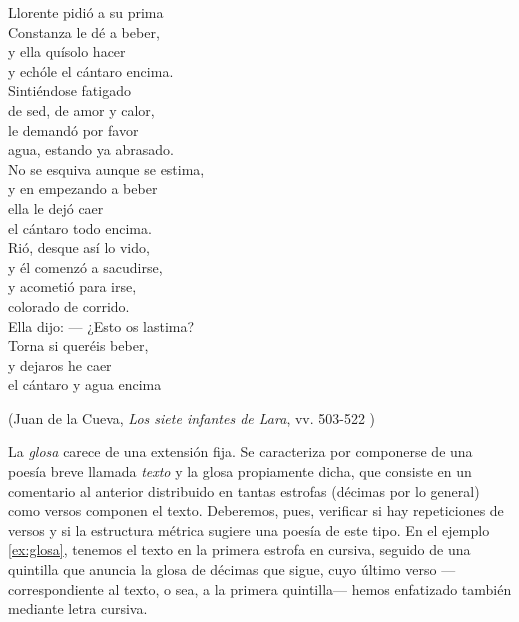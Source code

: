 \begin{exe}
	\ex\label{ex:cancion}\begin{multicols}{2}Llorente pidió a su prima\\
	Constanza le dé a beber,\\
	y ella quísolo hacer\\
	y echóle el cántaro encima.\vspace{.333\baselineskip}\\
	Sintiéndose fatigado\\
	de sed, de amor y calor,\\
	le demandó por favor\\
	agua, estando ya abrasado.\vspace{.333\baselineskip}\\
	No se esquiva aunque se estima,\\
	y en empezando a beber\\
	ella le dejó caer\\
	el cántaro todo encima.\vspace{.333\baselineskip}\\
	Rió, desque así lo vido,\\
	y él comenzó a sacudirse,\\
	y acometió para irse,\\
	colorado de corrido.\vspace{.333\baselineskip}\\
	Ella dijo: — ¿Esto os lastima?\\
	Torna si queréis beber,\\
	y dejaros he caer\\
	el cántaro y agua encima\vspace{.6\baselineskip}
\end{multicols}
\strut\hfill(Juan de la Cueva, \textit{Los siete
	infantes de Lara}, vv. 503-522 \nocite{cueva1924})\end{exe}


La \textit{glosa} carece de una extensión fija. Se caracteriza por componerse de una poesía breve llamada \textit{texto} y la glosa propiamente dicha, que consiste en un comentario al anterior distribuido en tantas estrofas (décimas por lo general) como versos componen el texto. Deberemos, pues, verificar si hay repeticiones de versos y si la estructura métrica sugiere una poesía de este tipo. En el ejemplo \ref{ex:glosa}, tenemos el texto en la primera estrofa en cursiva, seguido de una quintilla que anuncia la glosa de décimas que sigue, cuyo último verso —correspondiente al texto, o sea, a la primera quintilla— hemos enfatizado también mediante letra cursiva.

